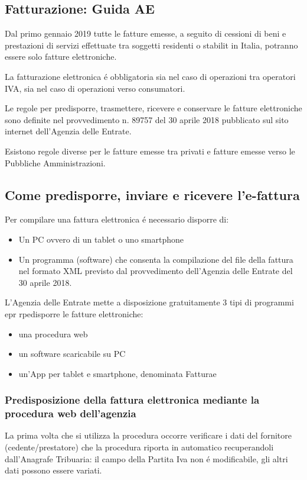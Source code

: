 \documentclass{article}
\begin{document}
\subsection{Fatturazione: Guida AE}
Dal primo gennaio 2019 tutte le fatture emesse, a seguito di cessioni di beni e prestazioni di servizi effettuate tra soggetti residenti o stabilit in Italia, potranno essere solo fatture elettroniche. 

La fatturazione elettronica \'e obbligatoria sia nel caso di operazioni tra operatori IVA, sia nel caso di operazioni verso consumatori.

Le regole per predisporre, trasmettere, ricevere e conservare le fatture elettroniche sono definite nel provvedimento n. 89757 del 30 aprile 2018 pubblicato sul sito internet dell'Agenzia delle Entrate. 

Esistono regole diverse per le fatture emesse tra privati e fatture emesse verso le Pubbliche Amministrazioni. 

\subsection{Come predisporre, inviare e ricevere l'e-fattura}
Per compilare una fattura elettronica \'e necessario disporre di:
\begin{itemize}
    \item Un PC ovvero di un tablet o uno smartphone
    \item Un programma (software) che consenta la compilazione del file della fattura nel formato XML previsto dal provvedimento dell'Agenzia delle Entrate del 30 aprile 2018.
\end{itemize}

L'Agenzia delle Entrate mette a disposizione gratuitamente 3 tipi di programmi epr rpedisporre le fatture elettroniche:

\begin{itemize}
    \item una procedura web
    \item un software scaricabile su PC
    \item un'App per tablet e smartphone, denominata Fatturae
\end{itemize}

\subsubsection{Predisposizione della fattura elettronica mediante la procedura web dell'agenzia}
La prima volta che si utilizza la procedura occorre verificare i dati del fornitore (cedente/prestatore) che la procedura riporta in automatico recuperandoli dall'Anagrafe Tribuaria: il campo della Partita Iva non \'e modificabile, gli altri dati possono essere variati. 
\end{document}

